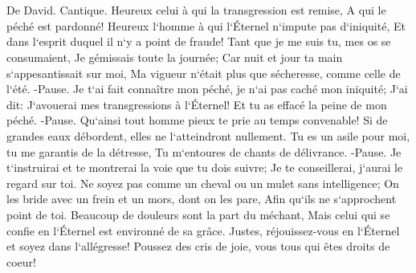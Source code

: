 \chapter{}

\verse De David. Cantique. Heureux celui à qui la transgression est remise, A qui le péché est pardonné! 
\verse Heureux l`homme à qui l`Éternel n`impute pas d`iniquité, Et dans l`esprit duquel il n`y a point de fraude! 
\verse Tant que je me suis tu, mes os se consumaient, Je gémissais toute la journée; 
\verse Car nuit et jour ta main s`appesantissait sur moi, Ma vigueur n`était plus que sécheresse, comme celle de l`été. -Pause. 
\verse Je t`ai fait connaître mon péché, je n`ai pas caché mon iniquité; J`ai dit: J`avouerai mes transgressions à l`Éternel! Et tu as effacé la peine de mon péché. -Pause. 
\verse Qu`ainsi tout homme pieux te prie au temps convenable! Si de grandes eaux débordent, elles ne l`atteindront nullement. 
\verse Tu es un asile pour moi, tu me garantis de la détresse, Tu m`entoures de chants de délivrance. -Pause. 
\verse Je t`instruirai et te montrerai la voie que tu dois suivre; Je te conseillerai, j`aurai le regard sur toi. 
\verse Ne soyez pas comme un cheval ou un mulet sans intelligence; On les bride avec un frein et un mors, dont on les pare, Afin qu`ils ne s`approchent point de toi. 
\verse Beaucoup de douleurs sont la part du méchant, Mais celui qui se confie en l`Éternel est environné de sa grâce. 
\verse Justes, réjouissez-vous en l`Éternel et soyez dans l`allégresse! Poussez des cris de joie, vous tous qui êtes droits de coeur! 

\chapter{}

